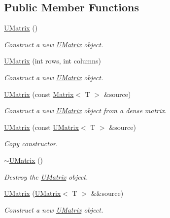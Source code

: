 \subsection*{Public Member Functions}
\begin{DoxyCompactItemize}
\item 
\mbox{\hyperlink{class_u_matrix_a7c6cfdd2d26c56bca1f5b1d79e7f2ee2}{U\+Matrix}} ()
\begin{DoxyCompactList}\small\item\em Construct a new \mbox{\hyperlink{class_u_matrix}{U\+Matrix}} object. \end{DoxyCompactList}\item 
\mbox{\hyperlink{class_u_matrix_ad0d2d3e05ad904daed36504eddd25a2c}{U\+Matrix}} (int rows, int columns)
\begin{DoxyCompactList}\small\item\em Construct a new \mbox{\hyperlink{class_u_matrix}{U\+Matrix}} object. \end{DoxyCompactList}\item 
\mbox{\hyperlink{class_u_matrix_a784cebb7d674ada97720bcb34f49ca6b}{U\+Matrix}} (const \mbox{\hyperlink{class_matrix}{Matrix}}$<$ T $>$ \&source)
\begin{DoxyCompactList}\small\item\em Construct a new \mbox{\hyperlink{class_u_matrix}{U\+Matrix}} object from a dense matrix. \end{DoxyCompactList}\item 
\mbox{\hyperlink{class_u_matrix_ab95abe504ff32df243d625b6b749077d}{U\+Matrix}} (const \mbox{\hyperlink{class_u_matrix}{U\+Matrix}}$<$ T $>$ \&source)
\begin{DoxyCompactList}\small\item\em Copy constructor. \end{DoxyCompactList}\item 
\mbox{\hyperlink{class_u_matrix_ada29056d4baec18fcb9bc47dc49e8d53}{$\sim$\+U\+Matrix}} ()
\begin{DoxyCompactList}\small\item\em Destroy the \mbox{\hyperlink{class_u_matrix}{U\+Matrix}} object. \end{DoxyCompactList}\item 
\mbox{\hyperlink{class_u_matrix_ab70aed159f4542aa4bbf9a222bd328ef}{U\+Matrix}} (\mbox{\hyperlink{class_u_matrix}{U\+Matrix}}$<$ T $>$ \&\&source)
\begin{DoxyCompactList}\small\item\em Construct a new \mbox{\hyperlink{class_u_matrix}{U\+Matrix}} object. \end{DoxyCompactList}\item 

\end{DoxyCompactItemize}
